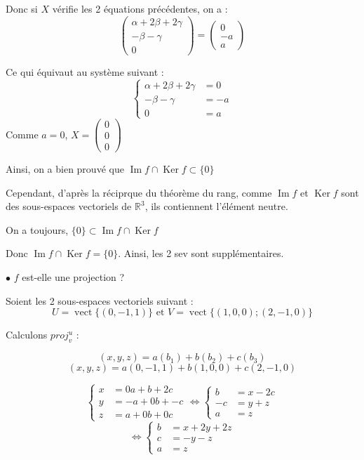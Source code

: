 \documentclass[a4paper,12pt]{article}
\DeclareMathOperator{\Ker}{Ker}
\DeclareMathOperator{\Img}{Im}
\DeclareMathOperator{\vect}{vect}
\begin{document}
Donc si $X$ vérifie les 2 équations précédentes, on a :
$$
\begin{pmatrix}
    \alpha+2\beta+2\gamma \\
    -\beta-\gamma\\
    0
\end{pmatrix}
=
\begin{pmatrix}0\\-a\\a\end{pmatrix}
$$

Ce qui équivaut au système suivant :
$$
  \left\{\begin{array}{rl}
  \alpha+2\beta+2\gamma & = 0\\
  -\beta-\gamma         & = -a\\
                    0   & = a 
  \end{array}\right.
$$
Comme $a=0$, $X=\begin{pmatrix}0\\0\\0\end{pmatrix}$

Ainsi, on a bien prouvé que $\Img f\cap\Ker f \subset\{0\}$

Cependant, d'après la réciprque du théorème du rang, comme $\Img f$ et $\Ker f$ sont des sous-espaces vectoriels de $\mathbb{R}^3$, ils contiennent l'élément neutre.

On a toujours, $\{0\}\subset\Img f \cap\Ker f$

Donc $\Img f\cap\Ker f=\{0\}$. Ainsi, les 2 sev sont supplémentaires.

$\bullet$ $f$ est-elle une projection ?

Soient les 2 sous-espaces vectoriels suivant :
$$U=\vect\{(0,-1,1)\} \mbox{ et } V=\vect\{(1,0,0);(2,-1,0)\}$$

Calculons $proj^u_v$ :

$$(x,y,z)=a(b_1)+b(b_2)+c(b_3)$$
$$(x,y,z)=a(0,-1,1)+b(1,0,0)+c(2,-1,0)$$


\[
  \left\{\begin{array}{rl}
    x &= 0a+b+2c \\
    y &= -a+0b+-c  \\
    z &= a+0b+0c
  \end{array}\right.
  \Leftrightarrow
  \left\{\begin{array}{rl}
    b &=x-2c \\
    -c &=y+z \\
    a &=z
  \end{array} \right.
\]
\[
  \Leftrightarrow
  \left\{\begin{array}{rl}
      b&=x+2y+2z\\
      c&=-y-z \\
      a&=z
  \end{array}\right.
\]
\end{document}
